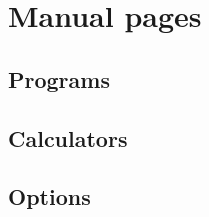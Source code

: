 \chapter{Manual pages}

\section{Programs}
\label{ref:programs}


\section{Calculators}
\label{ref:caclulators}


\section{Options}
\label{ref:options}


